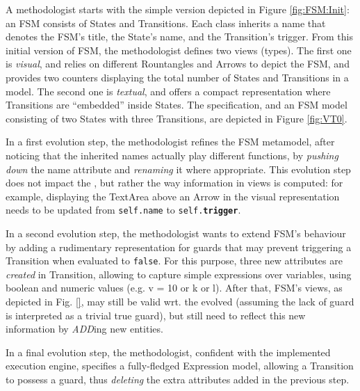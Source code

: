 A methodologist starts with the simple version depicted in Figure \ref{fig:FSM:Init}:
an \textsf{FSM} consists of \textsf{State}s and \textsf{Transition}s. Each class
inherits a \textsf{name} that denotes the \textsf{FSM}'s title, the \textsf{State}'s
name, and the \textsf{Transition}'s trigger. From this initial version of \textsf{FSM},
the methodologist defines two views (types). The first one is \emph{visual},
and relies on different \textsf{Rountangle}s and \textsf{Arrow}s to depict the 
\textsf{FSM}, and provides two counters displaying the total number of \textsf{State}s
and \textsf{Transition}s in a model. The second one is \emph{textual}, and offers
a compact representation where \textsf{Transition}s are ``embedded'' inside 
\textsf{State}s. The specification, and an \textsf{FSM} model consisting of two
\textsf{State}s with three \textsf{Transition}s, are depicted in Figure \ref{fig:VT0}.

In a first evolution step, the methodologist refines the \textsf{FSM} metamodel,
after noticing that the inherited \textsf{name}s actually play different functions,
by  \emph{pushing down} the \textsf{name} attribute and \emph{renaming} it where
appropriate. This evolution step does not impact the \viewtypes, but rather the
way information in views is computed: for example, displaying the \textsf{TextArea}
above an \textsf{Arrow} in the visual representation needs to be updated from
\texttt{self.name} to \texttt{self.\textbf{trigger}}. 

In a second evolution step, the methodologist wants to extend \textsf{FSM}'s 
behaviour by adding a rudimentary representation for guards that may prevent
triggering a \textsf{Transition} when evaluated to \texttt{false}. For this purpose,
three new attributes are \emph{created} in \textsf{Transition}, allowing to capture
simple expressions over \textsf{var}iables, using boolean and numeric \textsf{value}s
(e.g. \textsf{v = 10} or \textsf{k or l}). After that, \textsf{FSM}'s views, as 
depicted in Fig. \ref{}, may still be valid wrt. the evolved \metamodel 
(assuming the lack of guard is interpreted as a trivial \textsf{true} guard),
but \viewtypes still need to reflect this new information by \emph{ADD}ing new 
entities. 

In a final evolution step, the methodologist, confident with the implemented
execution engine, specifies a fully-fledged \textsf{Expression} model,
allowing a \textsf{Transition} to possess a \textsf{guard}, thus \emph{deleting}
the extra attributes added in the previous step.


